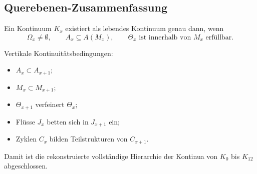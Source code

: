 \subsection{Querebenen-Zusammenfassung}

Ein Kontinuum \(K_x\) existiert als lebendes Kontinuum genau dann, wenn
\[
   \Omega_x \neq \emptyset,
   \qquad
   A_x \subseteq A(M_x),
   \qquad
   \Theta_x \text{ ist innerhalb von } M_x \text{ erfüllbar.}
\]

Vertikale Kontinuitätsbedingungen:
\begin{itemize}
    \item \(A_x \subset A_{x+1}\);
    \item \(M_x \subset M_{x+1}\);
    \item \(\Theta_{x+1}\) verfeinert \(\Theta_x\);
    \item Flüsse \(J_x\) betten sich in \(J_{x+1}\) ein;
    \item Zyklen \(C_x\) bilden Teilstrukturen von \(C_{x+1}\).
\end{itemize}

Damit ist die rekonstruierte vollständige Hierarchie der Kontinua von
\(K_0\) bis \(K_{12}\) abgeschlossen.
